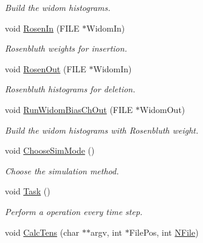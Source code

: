 \begin{DoxyCompactItemize}
\begin{DoxyCompactList}\small\item\em Build the widom histograms. \end{DoxyCompactList}\item 
void \hyperlink{classForces_a3f16bbc64bdd8ac4835e6a4702e30678}{Rosen\+In} (F\+I\+LE $\ast$Widom\+In)\hypertarget{classForces_a3f16bbc64bdd8ac4835e6a4702e30678}{}\label{classForces_a3f16bbc64bdd8ac4835e6a4702e30678}

\begin{DoxyCompactList}\small\item\em Rosenbluth weights for insertion. \end{DoxyCompactList}\item 
void \hyperlink{classForces_a7a1566050eaabfebba82e0b6002d797b}{Rosen\+Out} (F\+I\+LE $\ast$Widom\+In)\hypertarget{classForces_a7a1566050eaabfebba82e0b6002d797b}{}\label{classForces_a7a1566050eaabfebba82e0b6002d797b}

\begin{DoxyCompactList}\small\item\em Rosenbluth histograms for deletion. \end{DoxyCompactList}\item 
void \hyperlink{classForces_a395a965e8373d10dc626ea945f161168}{Run\+Widom\+Bias\+Ch\+Out} (F\+I\+LE $\ast$Widom\+Out)\hypertarget{classForces_a395a965e8373d10dc626ea945f161168}{}\label{classForces_a395a965e8373d10dc626ea945f161168}

\begin{DoxyCompactList}\small\item\em Build the widom histograms with Rosenbluth weight. \end{DoxyCompactList}\item 
void \hyperlink{classForces_a111835c2cd5d392591f9e32ea6d9cf19}{Choose\+Sim\+Mode} ()
\begin{DoxyCompactList}\small\item\em Choose the simulation method. \end{DoxyCompactList}\item 
void \hyperlink{classForces_af662b8c150e7cdd3983066e8dab609be}{Task} ()\hypertarget{classForces_af662b8c150e7cdd3983066e8dab609be}{}\label{classForces_af662b8c150e7cdd3983066e8dab609be}

\begin{DoxyCompactList}\small\item\em Perform a operation every time step. \end{DoxyCompactList}\item 
void \hyperlink{classForces_aac83d4bd108ccaa2c52289f05ea0d009}{Calc\+Tens} (char $\ast$$\ast$argv, int $\ast$File\+Pos, int \hyperlink{classForces_afc36f5ebb0ee5c1be5fc2161e1fa3959}{N\+File})\hypertarget{classForces_aac83d4bd108ccaa2c52289f05ea0d009}{}\label{classForces_aac83d4bd108ccaa2c52289f05ea0d009}


\end{DoxyCompactItemize}
